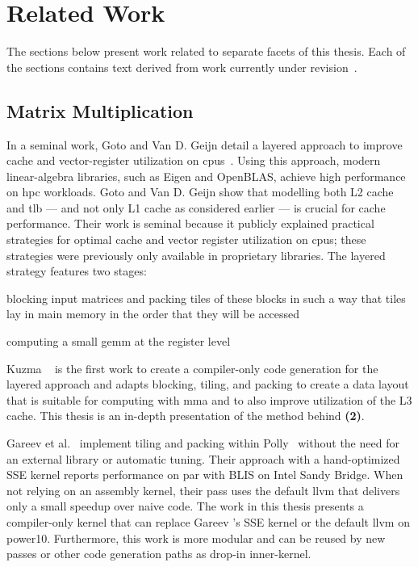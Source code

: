 \documentclass[\main/thesis.tex]{subfiles}
\begin{document}
\chapter{Related Work}
\label{cha:related}
The sections below present work related to separate facets of this thesis.
Each of the sections contains text derived from work currently under revision~\autocite{kuzma2021fast}.

\section{Matrix Multiplication}
In a seminal work, Goto and Van D. Geijn detail a layered approach to improve cache and vector-register utilization on \glspl{cpu}~\autocite{goto2008anatomy}.
Using this approach, modern linear-algebra libraries, such as Eigen and OpenBLAS, achieve high performance on \gls{hpc} workloads.
Goto and Van D. Geijn show that modelling both L2 cache and \gls{tlb} --- and not only L1 cache as considered earlier --- is crucial for cache performance.
Their work is seminal because it publicly explained practical strategies for optimal cache and vector register utilization on \glspl{cpu}; these strategies were previously only available in proprietary libraries.
The layered strategy features two stages:
\begin{enumerate*}[itemjoin={{; }}, itemjoin*={{; and }}, label=\textbf{(\arabic*)}, after={.}]
  \item blocking input matrices and packing tiles of these blocks in such a way that tiles lay in main memory in the order that they will be accessed
  \item computing a small \gls{gemm} at the register level
\end{enumerate*}
Kuzma \etal~\autocite{kuzma2021fast} is the first work to create a compiler-only code generation for the layered approach and adapts blocking, tiling, and packing to create a data layout that is suitable for computing with \gls{mma} and to also improve utilization of the L3 cache.
This thesis is an in-depth presentation of the method behind \textbf{(2)}.

Gareev et al.~\autocite{gareev2018high} implement tiling and packing within Polly~\autocite{grosser2011polly,grosser2012polly} without the need for an external library or automatic tuning.
Their approach with a hand-optimized SSE kernel reports performance on par with BLIS on Intel Sandy Bridge.
When not relying on an assembly kernel, their pass uses the default \gls{llvm}  that delivers only a small speedup over naive code.
The work in this thesis presents a compiler-only kernel that can replace Gareev \etal's SSE kernel or the default \gls{llvm}  on \gls{power10}.
Furthermore, this work is more modular and can be reused by new passes or other code generation paths as drop-in inner-kernel.
\end{document}
